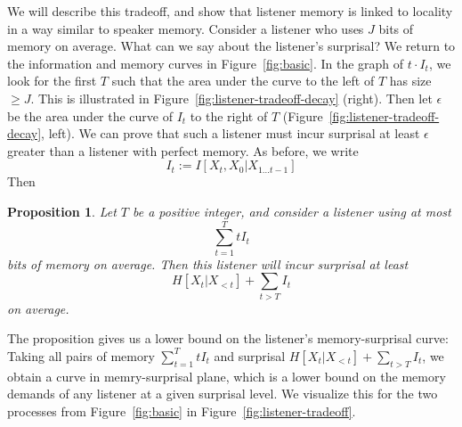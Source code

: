 \documentclass[11pt,letterpaper]{article}
\newcounter{theorem}
\newtheorem{proposition}[theorem]{Proposition}
\begin{document}
We will describe this tradeoff, and show that listener memory is linked to locality in a way similar to speaker memory.
Consider a listener who uses $J$ bits of memory on average.
What can we say about the listener's surprisal?
We return to the information and memory curves in Figure~\ref{fig:basic}.
In the graph of $t \cdot I_t$, we look for the first $T$ such that the area under the curve to the left of $T$ has size $\geq J$.
This is illustrated in Figure~\ref{fig:listener-tradeoff-decay} (right).
Then let $\epsilon$ be the area under the curve of $I_t$ to the right of $T$ (Figure~\ref{fig:listener-tradeoff-decay}, left).
We can prove that such a listener must incur surprisal at least $\epsilon$ greater than a listener with perfect memory.
As before, we write $$I_t := I[X_t, X_0 | X_{1\dots t-1}]$$
Then


\begin{proposition}\label{prop:suboptimal}
	Let $T$ be a positive integer, and consider a listener using at most
$$\sum_{t=1}^T t I_t$$
bits of memory on average.
Then this listener will incur surprisal at least
	$$H[X_t|X_{<t}] + \sum_{t > T} I_t$$
	on average.
\end{proposition}


The proposition gives us a lower bound on the listener's memory-surprisal curve: Taking all pairs of memory $\sum_{t=1}^T t I_t$ and surprisal $H[X_t|X_{<t}] + \sum_{t > T} I_t$, we obtain a curve in memry-surprisal plane, which is a lower bound on the memory demands of any listener at a given surprisal level.
We visualize this for the two processes from Figure~\ref{fig:basic} in Figure~\ref{fig:listener-tradeoff}.
\end{document}
